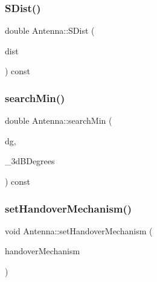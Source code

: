 \mbox{\label{class_antenna_ae60ab40ded94be407c3b7455f4e886fe}} 
\subsubsection{\texorpdfstring{SDist()}{SDist()}}
{\footnotesize\ttfamily double Antenna\+::\+S\+Dist (\begin{DoxyParamCaption}\item[{double}]{dist }\end{DoxyParamCaption}) const\hspace{0.3cm}{\ttfamily [private]}}

\mbox{\label{class_antenna_a48ef89b0d1bd313bae4ca863da1cc77e}} 
\subsubsection{\texorpdfstring{searchMin()}{searchMin()}}
{\footnotesize\ttfamily double Antenna\+::search\+Min (\begin{DoxyParamCaption}\item[{double}]{dg,  }\item[{vector$<$ pair$<$ double, double $>$$>$}]{\+\_\+3d\+B\+Degrees }\end{DoxyParamCaption}) const\hspace{0.3cm}{\ttfamily [private]}}

\mbox{\label{class_antenna_a08ae04778bc036f108762fa9be818332}} 
\subsubsection{\texorpdfstring{setHandoverMechanism()}{setHandoverMechanism()}}
{\footnotesize\ttfamily void Antenna\+::set\+Handover\+Mechanism (\begin{DoxyParamCaption}\item[{\mbox{\hyperlink{class_holdable_agent_ae2c334b004d7b9c5a999cf2618e4e518}{Holdable\+Agent\+::\+C\+O\+N\+N\+E\+C\+T\+I\+O\+N\+\_\+\+T\+Y\+PE}}}]{handover\+Mechanism }\end{DoxyParamCaption})}

